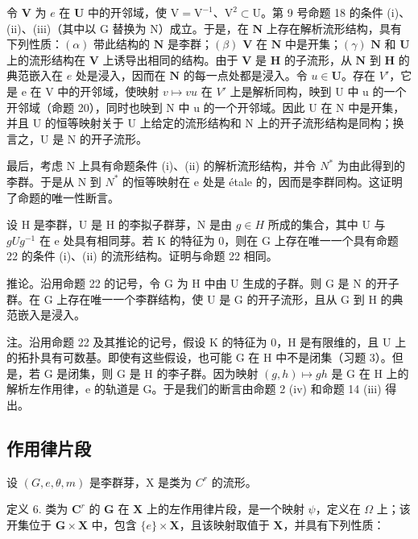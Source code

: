 令 \(\mathbf{V}\) 为 \(e\) 在 \(\mathbf{U}\) 中的开邻域，使 \(\mathrm{V} = \mathrm{V}^{-1}\)、\(\mathrm{V}^2 \subset \mathrm{U}\)。第 9 号命题 18 的条件 (i)、(ii)、(iii)（其中以 \(\mathrm{G}\) 替换为 \(\mathrm{N}\)）成立。于是，在 \(\mathbf{N}\) 上存在解析流形结构，具有下列性质：\((\alpha)\) 带此结构的 \(\mathbf{N}\) 是李群；\((\beta)\) \(\mathbf{V}\) 在 \(\mathbf{N}\) 中是开集；\((\gamma)\) \(\mathbf{N}\) 和 \(\mathbf{U}\) 上的流形结构在 \(\mathbf{V}\) 上诱导出相同的结构。由于 \(\mathbf{V}\) 是 \(\mathbf{H}\) 的子流形，从 \(\mathbf{N}\) 到 \(\mathbf{H}\) 的典范嵌入在 \(e\) 处是浸入，因而在 \(\mathbf{N}\) 的每一点处都是浸入。令 \(u \in \mathbf{U}\)。存在 \(V'\)，它是 e 在 V 中的开邻域，使映射 \(v \mapsto vu\) 在 \(V'\) 上是解析同构，映到 U 中 u 的一个开邻域（命题 20），同时也映到 N 中 u 的一个开邻域。因此 U 在 N 中是开集，并且 U 的恒等映射关于 U 上给定的流形结构和 N 上的开子流形结构是同构；换言之，U 是 N 的开子流形。

最后，考虑 N 上具有命题条件 (i)、(ii) 的解析流形结构，并令 \(N^{*}\) 为由此得到的李群。于是从 N 到 \(N^{*}\) 的恒等映射在 e 处是 étale 的，因而是李群同构。这证明了命题的唯一性断言。

设 H 是李群，U 是 H 的李拟子群芽，N 是由 \(g \in H\) 所成的集合，其中 U 与 \(gUg^{-1}\) 在 e 处具有相同芽。若 K 的特征为 0，则在 G 上存在唯一一个具有命题 22 的条件 (i)、(ii) 的流形结构。证明与命题 22 相同。

推论。沿用命题 22 的记号，令 G 为 H 中由 U 生成的子群。则 G 是 N 的开子群。在 G 上存在唯一一个李群结构，使 U 是 G 的开子流形，且从 G 到 H 的典范嵌入是浸入。

注。沿用命题 22 及其推论的记号，假设 K 的特征为 0，H 是有限维的，且 U 上的拓扑具有可数基。即使有这些假设，也可能 G 在 H 中不是闭集（习题 3）。但是，若 G 是闭集，则 G 是 H 的李子群。因为映射 \((g,h)\mapsto gh\) 是 G 在 H 上的解析左作用律，e 的轨道是 G。于是我们的断言由命题 2 (iv) 和命题 14 (iii) 得出。

\subsection{作用律片段}

设 \((G, e, \theta, m)\) 是李群芽，X 是类为 \(C^r\) 的流形。

定义 6. 类为 \(\mathbf{C}^r\) 的 \(\mathbf{G}\) 在 \(\mathbf{X}\) 上的左作用律片段，是一个映射 \(\psi\)，定义在 \(\Omega\) 上；该开集位于 \(\mathbf{G} \times \mathbf{X}\) 中，包含 \(\{e\} \times \mathbf{X}\)，且该映射取值于 \(\mathbf{X}\)，并具有下列性质：

